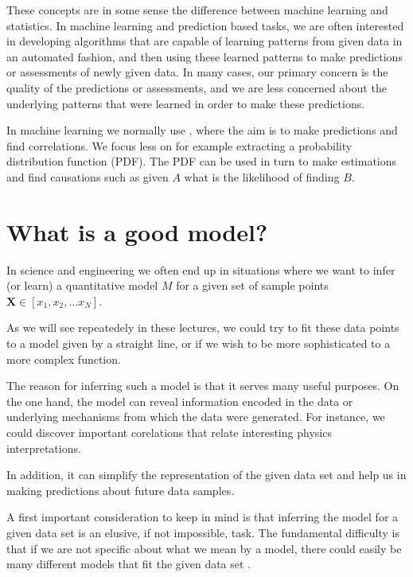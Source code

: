 \documentclass[letterpaper,10pt,english]{sphinxmanual}
\begin{document}
These concepts are in some sense the difference between machine
learning and statistics. In machine learning and prediction based
tasks, we are often interested in developing algorithms that are
capable of learning patterns from given data in an automated fashion,
and then using these learned patterns to make predictions or
assessments of newly given data. In many cases, our primary concern
is the quality of the predictions or assessments, and we are less
concerned about the underlying patterns that were learned in order
to make these predictions.

In machine learning we normally use ,
where the aim is to make predictions and find correlations. We focus
less on for example extracting a probability distribution function (PDF). The PDF can be
used in turn to make estimations and find causations such as given \(A\)
what is the likelihood of finding \(B\).


\chapter{What is a good model?}
\label{\detokenize{chapter1:what-is-a-good-model}}
In science and engineering we often end up in situations where we want to infer (or learn) a
quantitative model \(M\) for a given set of sample points \(\boldsymbol{X} \in [x_1, x_2,\dots x_N]\).

As we will see repeatedely in these lectures, we could try to fit these data points to a model given by a
straight line, or if we wish to be more sophisticated to a more complex
function.

The reason for inferring such a model is that it
serves many useful purposes. On the one hand, the model can reveal information
encoded in the data or underlying mechanisms from which the data were generated. For instance, we could discover important
corelations that relate interesting physics interpretations.

In addition, it can simplify the representation of the given data set and help
us in making predictions about  future data samples.

A first important consideration to keep in mind is that inferring the  model
for a given data set is an elusive, if not impossible, task. The fundamental difficulty
is that if we are not specific about what we mean by a  model, there
could easily be many different models that fit the given data set .
\end{document}
